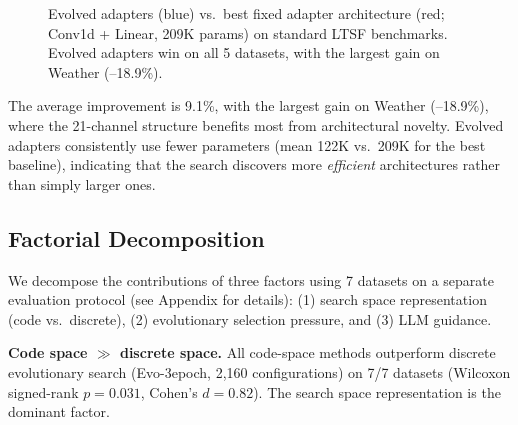 \documentclass{article}
\begin{document}
\begin{figure}[h]
\centering
{}
\caption{Evolved adapters (blue) vs.\ best fixed adapter architecture (red; Conv1d + Linear, 209K params) on standard LTSF benchmarks. Evolved adapters win on all 5 datasets, with the largest gain on Weather (--18.9\%).}
\label{fig:main_results}
\end{figure}

The average improvement is 9.1\%, with the largest gain on Weather (--18.9\%), where the 21-channel structure benefits most from architectural novelty. Evolved adapters consistently use fewer parameters (mean 122K vs.\ 209K for the best baseline), indicating that the search discovers more \textit{efficient} architectures rather than simply larger ones.

\subsection{Factorial Decomposition}
\label{sec:decomposition}

We decompose the contributions of three factors using 7 datasets on a separate evaluation protocol (see Appendix for details): (1) search space representation (code vs.\ discrete), (2) evolutionary selection pressure, and (3) LLM guidance.

\textbf{Code space $\gg$ discrete space.} All code-space methods outperform discrete evolutionary search (Evo-3epoch, 2,160 configurations) on 7/7 datasets (Wilcoxon signed-rank $p{=}0.031$, Cohen's $d{=}0.82$). The search space representation is the dominant factor.
\end{document}
